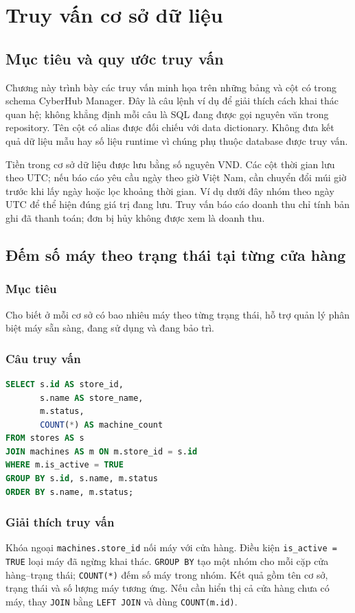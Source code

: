 \chapter{Truy vấn cơ sở dữ liệu}

\section{Mục tiêu và quy ước truy vấn}
Chương này trình bày các truy vấn minh họa trên những bảng và cột có trong schema CyberHub Manager. Đây là câu lệnh ví dụ để giải thích cách khai thác quan hệ; không khẳng định mỗi câu là SQL đang được gọi nguyên văn trong repository. Tên cột có alias được đối chiếu với data dictionary. Không đưa kết quả dữ liệu mẫu hay số liệu runtime vì chúng phụ thuộc database được truy vấn.

Tiền trong cơ sở dữ liệu được lưu bằng số nguyên VND. Các cột thời gian lưu theo UTC; nếu báo cáo yêu cầu ngày theo giờ Việt Nam, cần chuyển đổi múi giờ trước khi lấy ngày hoặc lọc khoảng thời gian. Ví dụ dưới đây nhóm theo ngày UTC để thể hiện đúng giá trị đang lưu. Truy vấn báo cáo doanh thu chỉ tính bản ghi đã thanh toán; đơn bị hủy không được xem là doanh thu.

\section{Đếm số máy theo trạng thái tại từng cửa hàng}
\subsection*{Mục tiêu}
Cho biết ở mỗi cơ sở có bao nhiêu máy theo từng trạng thái, hỗ trợ quản lý phân biệt máy sẵn sàng, đang sử dụng và đang bảo trì.

\subsection*{Câu truy vấn}
\begin{lstlisting}[language=SQL]
SELECT s.id AS store_id,
       s.name AS store_name,
       m.status,
       COUNT(*) AS machine_count
FROM stores AS s
JOIN machines AS m ON m.store_id = s.id
WHERE m.is_active = TRUE
GROUP BY s.id, s.name, m.status
ORDER BY s.name, m.status;
\end{lstlisting}

\subsection*{Giải thích truy vấn}
Khóa ngoại \texttt{machines.store\_id} nối máy với cửa hàng. Điều kiện \texttt{is\_active = TRUE} loại máy đã ngừng khai thác. \texttt{GROUP BY} tạo một nhóm cho mỗi cặp cửa hàng--trạng thái; \texttt{COUNT(*)} đếm số máy trong nhóm. Kết quả gồm tên cơ sở, trạng thái và số lượng máy tương ứng. Nếu cần hiển thị cả cửa hàng chưa có máy, thay \texttt{JOIN} bằng \texttt{LEFT JOIN} và dùng \texttt{COUNT(m.id)}.

